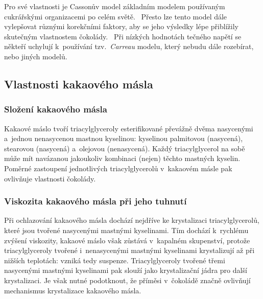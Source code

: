 \documentclass[12pt]{article}
\begin{document}
\par\noindent
Pro své vlastnosti je Cassonův model základním modelem používaným cukrářskými organizacemi po celém světě.~\cite{Article:Determination_of_chocolate_viscosity} Přesto lze tento model dále vylepšovat různými korekčními faktory, aby se jeho výsledky lépe přiblížily skutečným vlastnostem čokolády.~\cite{Article:Determination_of_chocolate_viscosity} Při nízkých hodnotách tečného napětí se někteří uchylují k~používání tzv.~\emph{Carreau} modelu, který nebudu dále rozebírat, nebo jiných modelů.~\cite{Article:Flow_properties_molten_chocolate}\cite{material:Tokove_chovani_reologicke_modely}

\subsection{Vlastnosti kakaového másla}%

\subsubsection{Složení kakaového másla}%

Kakaové máslo tvoří triacylglyceroly esterifikované převážně dvěma nasycenými a~jednou nenasycenou mastnou kyselinou: kyselinou palmitovou (nasycená), stearovou (nasycená) a~olejovou (nenasycená). Každý triacylglycerol na sobě může mít navázanou jakoukoliv kombinaci (nejen) těchto mastných kyselin. Poměrné zastoupení jednotlivých triacylglycerolů v~kakaovém másle pak ovlivňuje vlastnosti čokolády.~\cite{Article:precrystallization}\cite{wiki:Triacylglycerol}

\subsubsection{Viskozita kakaového másla při jeho tuhnutí}%

Při ochlazování kakaového másla dochází nejdříve ke krystalizaci triacylglycerolů, které jsou tvořené nasycenými mastnými kyselinami. Tím dochází k~rychlému zvýšení viskozity, kakaové máslo však zůstává v~kapalném skupenství, protože triacylglyceroly tvořené i~nenasycenými mastnými kyselinami krystalizují až při nižších teplotách: vzniká tedy suspenze\footnotemark. Triacylglyceroly tvořené třemi nasycenými mastnými kyselinami pak slouží jako krystalizační jádra pro další krystalizaci. Je však nutné podotknout, že příměsi v~čokoládě značně ovlivňují mechanismus krystalizace kakaového másla.~\cite{Article:precrystallization}
\end{document}
